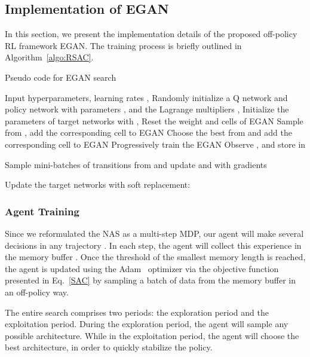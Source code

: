 \documentclass[runningheads]{llncs}
\begin{document}
\subsection{Implementation of EGAN}
In this section, we present the implementation details of the proposed off-policy RL framework EGAN.  The training process is briefly outlined in Algorithm~\ref{algo:RSAC}.
\begin{algorithm}[tb]
   \caption{Pseudo code for EGAN  search}
   \label{algo:RSAC}
\begin{algorithmic}
    \STATE Input hyperparameters, learning rates ,
   \STATE Randomly initialize a Q network  and policy network  with parameters ,   and the Lagrange multipliers , 
    \STATE Initialize the parameters of target networks with ,  
   \STATE Reset the weight and cells of EGAN
   \STATE Sample  from , add the corresponding cell to EGAN
    \STATE Choose the best  from  and add the corresponding cell to EGAN
   \ENDIF
   \STATE Progressively train the EGAN
   \STATE Observe ,  and store  in 
  
   \ENDFOR
   \STATE Sample mini-batches of transitions from  and update  and  with gradients

    \STATE Update the target networks with soft replacement:
          
   \ENDFOR
   \ENDFOR

\end{algorithmic}
\end{algorithm}





\subsubsection{Agent Training}
Since we reformulated the NAS as a multi-step MDP, our agent will make several decisions in any trajectory . In each step, the agent will collect this experience  in the memory buffer . Once the threshold of the smallest memory length is reached, the agent is updated using the Adam~\cite{kingma2014adam} optimizer via the objective function presented in Eq.~\ref{SAC} by sampling a batch of data from the memory buffer  in an off-policy way.

The entire search comprises two periods: the exploration period and the exploitation period. During the exploration period, the agent will sample any possible architecture. While in the exploitation period, the agent will choose the best architecture, in order to quickly stabilize the policy.
\end{document}
